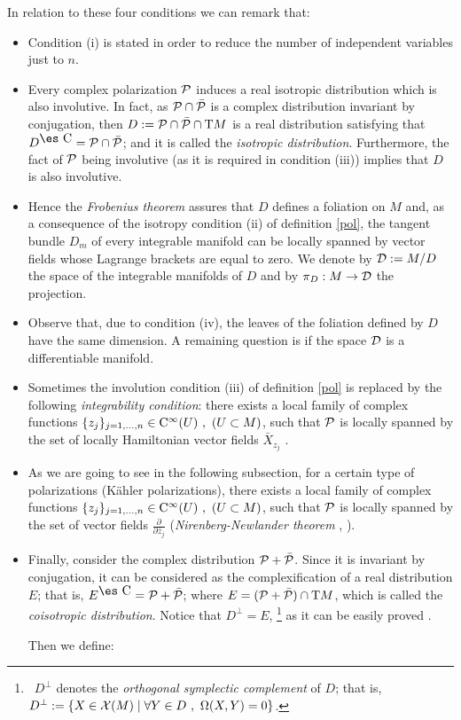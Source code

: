 \documentclass[12pt]{article}
\theoremstyle{plain}
\def\dst{\(}
\def\derpar#1#2{\frac{\partial{#1}}{\partial{#2}}}
\def\P{{\cal P}}
\def\D{{\cal D}}
\def\Complex{\mbox{\es C}}
\def\Tan{{\rm T}}
\def\Cinfty{{\rm C}^\infty}
\begin{document}
In relation to these four conditions we can remark that:
\begin{itemize}
\item
Condition (i) is stated in order to reduce
the number of independent variables just to $n$.
\item
Every complex polarization $\P$ induces a
real isotropic distribution which is also involutive.
In fact, as $\P \cap \bar \P$
is a complex distribution invariant by conjugation, then
$D := \P \cap \bar \P \cap \Tan M$
is a real distribution satisfying that
$D^{\Complex} = \P \cap \bar \P$;
and it is called the {\it isotropic distribution}.
Furthermore, the fact of $\P$ being involutive
(as it is required in condition (iii)) implies that $D$
is also involutive.
\item
Hence the {\it Frobenius theorem\/}
assures that $D$ defines a foliation on $M$ and,
as a consequence of the isotropy condition
(ii) of definition \ref{pol},
the tangent bundle $D_m$ of every integrable manifold can be locally
spanned by
vector fields whose Lagrange brackets are equal to zero.
We denote by $\D := M/D$
the space of the integrable manifolds of $D$ and by
$\pi_D : M \to \D$ the projection.
\item
Observe that, due to condition (iv),
the leaves of the foliation defined by $D$
have the same dimension.
A remaining question is if the space ${\cal D}$
is a differentiable manifold.
\item
Sometimes the involution condition (iii) of definition \ref{pol}
is replaced by the following {\it integrability condition}:
there exists a local family of complex functions
$\{ z_j \}_{j=1, \ldots ,n} \in \Cinfty (U) \ ,\ (U \subset M)$,
such that $\P$ is locally spanned by
the set of locally Hamiltonian vector fields $\bar X_{z_j}$
\cite{Wo-80}.
\item
As we are going to see in the following subsection,
for a certain type of polarizations (K\"ahler polarizations),
there exists a local family of complex functions
$\{ z_j \}_{j=1, \ldots ,n} \in \Cinfty (U) \ ,\ (U \subset M)$,
such that $\P$ is locally spanned by
the set of vector fields \dst\derpar{}{\bar z_j}\)
({\it Nirenberg-Newlander theorem}
\cite{Ho-ica}, \cite{NN-cac} ).
\item
Finally, consider the complex distribution
$\P + \bar \P$.
Since it is invariant by conjugation,
it can be considered as the complexification
of a real distribution $E$; that is,
$E^{\Complex} = \P + \bar \P$;
where $E = (\P + \bar \P) \cap \Tan M$,
which is called the
{\it coisotropic distribution}.
Notice that $D^{\perp} = E$,%
\footnote
{\ $D^{\perp}$
denotes the
{\it orthogonal symplectic complement\/}
of $D$; that is,
$D^{\perp} := \{ X \in {\cal X}(M) \mid
\forall Y \in D \ , \ \Omega (X,Y) = 0 \}$.}
as it can be easily proved \cite{Ki-gq}.

Then we define:
\end{itemize}
\end{document}

